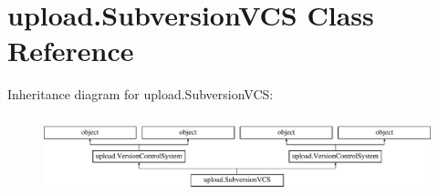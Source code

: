 \hypertarget{classupload_1_1SubversionVCS}{}\section{upload.\+Subversion\+V\+CS Class Reference}
\label{classupload_1_1SubversionVCS}
Inheritance diagram for upload.\+Subversion\+V\+CS\+:\begin{figure}[H]
\begin{center}
\leavevmode
\includegraphics[height=2.245989cm]{classupload_1_1SubversionVCS}
\end{center}
\end{figure}
